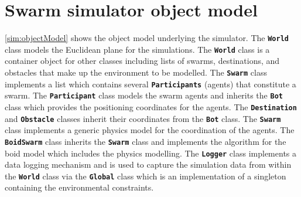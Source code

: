 \section{Swarm simulator object model}\label{sim:Simulator3}
\autoref{sim:objectModel} shows the object model underlying the simulator. The \texttt{\textbf{World}} class models the Euclidean plane for the simulations. The \texttt{\textbf{World}} class is a container object for other classes including lists of swarms, destinations, and obstacles that make up the environment to be modelled. The \texttt{\textbf{Swarm}} class implements a list which contains several \texttt{\textbf{Participants}} (agents) that constitute a swarm. The \texttt{\textbf{Participant}} class models the swarm agents and inherits the \texttt{\textbf{Bot}} class which provides the positioning coordinates for the agents. The \texttt{\textbf{Destination}} and \texttt{\textbf{Obstacle}} classes inherit their coordinates from the \texttt{\textbf{Bot}} class. The \texttt{\textbf{Swarm}} class implements a generic physics model for the coordination of the agents. The \texttt{\textbf{BoidSwarm}} class inherits the \texttt{\textbf{Swarm}} class and implements the algorithm for the boid model which includes the physics modelling. The \texttt{\textbf{Logger}} class implements a data logging mechanism and is used to capture the simulation data from within the \texttt{\textbf{World}} class via the \texttt{\textbf{Global}} class which is an implementation of a singleton containing the environmental constraints.

